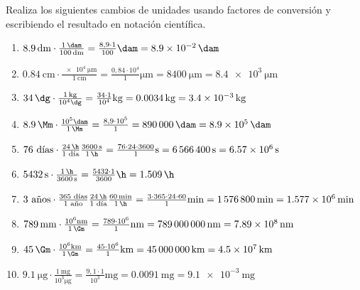 \documentclass[
  spanish,
]{article}
\author{}
\date{}
\begin{document}
\begin{exercise}Realiza los siguientes cambios de unidades usando
factores de conversión y escribiendo el resultado en notación
científica.

\begin{enumerate}
\def\labelenumi{\alph{enumi})}
\item
  \(\qty{8,9}{\dm} \cdot \frac{\qty{1}{\dam}}{\qty{100}{\dm}} = \frac{8,9 \cdot 1}{100} \unit{\dam} = \qty{8.9e-2}{\dam}\)
\item
  \(\qty{0,84}{\cm} \cdot \frac{\qty{e4}{\um}}{\qty{1}{\cm}} = \frac{0,84 \cdot 10^4}{1} \unit{\um}= \qty{8400}{\um} = \qty{8.4e3}{\um}\)
\item
  \(\qty{34}{\dg} \cdot \frac{\qty{1}{\kg}}{10^4 \unit{\dg}} = \frac{34 \cdot 1}{10^4} \unit{\kg} = \qty{0.0034}{\kg} = \qty{3.4e-3}{\kg}\)
\item
  \(\qty{8,9}{\Mm} \cdot \frac{10^5 \unit{\dam}}{\qty{1}{\Mm}} = \frac{8,9 \cdot 10^5}{1} = \qty{890000}{\dam} = \qty{8.9e5}{\dam}\)
\item
  \(76\text{ días} \cdot \frac{\qty{24}{\h}}{1\text{ día}} \frac{\qty{3600}{\s}}{\qty{1}{\h}} = \frac{76 \cdot 24 \cdot 3600}{1} \unit{\s}= \qty{6566400}{\s} = \qty{6.57e6}{\s}\)
\item
  \(\qty{5432}{\s} \cdot \frac{\qty{1}{\h}}{\qty{3600}{\s}} = \frac{5432 \cdot 1}{3600} \unit{\h} = \qty{1,509}{\h}\)
\item
  \(3\text{ años} \cdot \frac{365\text{ días}}{1\text{ año}} \frac{\qty{24}{\h}}{1\text{ día}} \frac{\qty{60}{\min}}{\qty{1}{\h}} = \frac{3 \cdot 365 \cdot 24 \cdot 60}{1} \unit{\min} = \qty{1576800}{\min} = \qty{1.577e6}{\min}\)
\item
  \(\qty{789}{\mm} \cdot \frac{10^6 \unit{\nm}}{\qty{1}{\Gm}} = \frac{789 \cdot 10^6}{1} \unit{\nm}= \qty{789000000}{\nm} = \qty{7.89e8}{\nm}\)
\item
  \(\qty{45}{\Gm} \cdot \frac{10^6 \unit{\km}}{\qty{1}{\Gm}} = \frac{45 \cdot 10^6}{1} \unit{\km} = \qty{45000000}{\km} = \qty{4.5e7}{\km}\)
\item
  \(\qty{9,1}{\ug} \cdot \frac{\qty{1}{\mg}}{10^3 \unit{\ug}} = \frac{9,1 \cdot 1}{10^3} \unit{\mg} = \qty{0.0091}{\mg} = \qty{9.1e-3}{\mg}\)
\end{enumerate}

\end{exercise}
\end{document}
